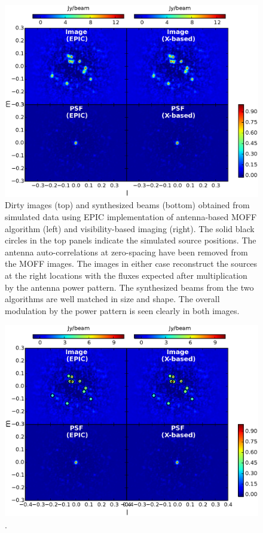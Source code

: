 \documentclass[a4paper,fleqn,usenatbib]{mnras}
\begin{document}
\begin{figure}
  \includegraphics[width=\columnwidth]{figure5}
  \caption{Dirty images (top) and synthesized beams (bottom) obtained from 
    simulated data using EPIC implementation of antenna-based MOFF algorithm 
    (left) and visibility-based imaging (right). The solid black circles in the
    top panels indicate the simulated source positions. The antenna 
    auto-correlations at zero-spacing have been removed from the MOFF images. 
    The images in either case reconstruct the sources at the right locations 
    with the fluxes expected after multiplication by the antenna power pattern. 
    The synthesized beams from the two algorithms are well matched in size and
    shape. The overall modulation by the power pattern is seen clearly in both
    images.}
  \label{fig:MOFF-FX-image}
\end{figure}

\begin{figure}
  \includegraphics[width=\columnwidth]{figure6}
  \caption{.}
  \label{fig:f-engine}
\end{figure}
\end{document}
